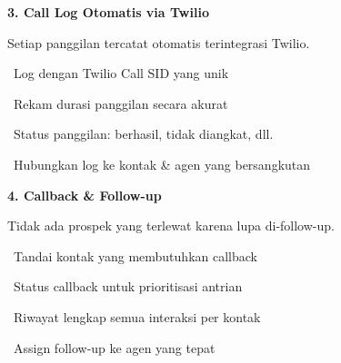 \documentclass[a4paper]{article}
\begin{document}
\vspace{8pt}

\noindent
\begin{minipage}[t]{0.485\textwidth}
    \colorbox{EmeraldPrimary}{%
        \begin{minipage}{\dimexpr\textwidth-2\fboxsep\relax}
            {\fontsize{10}{13}\selectfont\bfseries\color{White} 3. Call Log Otomatis via Twilio}
        \end{minipage}}\par
    \vspace{4pt}
    {\fontsize{9}{12}\selectfont\color{TextDark}%
    Setiap panggilan tercatat otomatis terintegrasi Twilio.\par\vspace{3pt}
    \textbullet\ Log dengan Twilio Call SID yang unik\par\vspace{2pt}%
    \textbullet\ Rekam durasi panggilan secara akurat\par\vspace{2pt}%
    \textbullet\ Status panggilan: berhasil, tidak diangkat, dll.\par\vspace{2pt}%
    \textbullet\ Hubungkan log ke kontak \& agen yang bersangkutan}%
\end{minipage}%
\hfill
\begin{minipage}[t]{0.485\textwidth}
    \colorbox{PurplePrimary}{%
        \begin{minipage}{\dimexpr\textwidth-2\fboxsep\relax}
            {\fontsize{10}{13}\selectfont\bfseries\color{White} 4. Callback \& Follow-up}
        \end{minipage}}\par
    \vspace{4pt}
    {\fontsize{9}{12}\selectfont\color{TextDark}%
    Tidak ada prospek yang terlewat karena lupa di-follow-up.\par\vspace{3pt}
    \textbullet\ Tandai kontak yang membutuhkan callback\par\vspace{2pt}%
    \textbullet\ Status callback untuk prioritisasi antrian\par\vspace{2pt}%
    \textbullet\ Riwayat lengkap semua interaksi per kontak\par\vspace{2pt}%
    \textbullet\ Assign follow-up ke agen yang tepat}%
\end{minipage}
\end{document}
